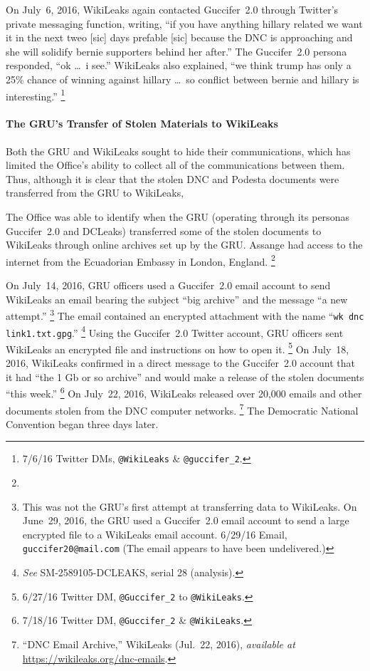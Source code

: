 On July~6, 2016, WikiLeaks again contacted Guccifer~2.0 through Twitter's private messaging function, writing, ``if you have anything hillary related we want it in the next tweo [sic] days prefable [sic] because the DNC is approaching and she will solidify bernie supporters behind her after.''
The Guccifer~2.0 persona responded, ``ok \dots\ i see.''
WikiLeaks also explained, ``we think trump has only a 25\% chance of winning against hillary \dots\ so conflict between bernie and hillary is interesting.''%
\footnote{7/6/16 Twitter DMs, \verb+@WikiLeaks+ \& \verb+@guccifer_2+.}

\paragraph{The GRU's Transfer of Stolen Materials to WikiLeaks}

Both the GRU and WikiLeaks sought to hide their communications, which has limited the Office's ability to collect all of the communications between them.
Thus, although it is clear that the stolen DNC and Podesta documents were transferred from the GRU to WikiLeaks, 

The Office was able to identify when the GRU (operating through its personas Guccifer~2.0 and DCLeaks) transferred some of the stolen documents to WikiLeaks through online archives set up by the GRU\null.
Assange had access to the internet from the Ecuadorian Embassy in London, England.
\footnote{}

On July~14, 2016, GRU officers used a Guccifer~2.0 email account to send WikiLeaks an email bearing the subject ``big archive'' and the message ``a new attempt.''%
\footnote{This was not the GRU's first attempt at transferring data to WikiLeaks.
On June~29, 2016, the GRU used a Guccifer~2.0 email account to send a large encrypted file to a WikiLeaks email account.
6/29/16 Email, \verb+guccifer20@mail.com+
(The email appears to have been undelivered.)}
The email contained an encrypted attachment with the name ``\verb+wk dnc link1.txt.gpg+.''%
\footnote{\textit{See} SM-2589105-DCLEAKS, serial 28 (analysis).}
Using the Guccifer~2.0 Twitter account, GRU officers sent WikiLeaks an encrypted file and instructions on how to open it.%
\footnote{6/27/16 Twitter DM, \verb+@Guccifer_2+ to \verb+@WikiLeaks+.}
On July~18, 2016, WikiLeaks confirmed in a direct message to the Guccifer~2.0 account that it had ``the 1 Gb or so archive'' and would make a release of the stolen documents ``this week.''%
\footnote{7/18/16 Twitter DM, \verb+@Guccifer_2+ \& \verb+@WikiLeaks+.}
On July~22, 2016, WikiLeaks released over 20,000 emails and other documents stolen from the DNC computer networks.%
\footnote{``DNC Email Archive,'' WikiLeaks (Jul.~22, 2016), \textit{available at} \url{https://wikileaks.org/dnc-emails}.}
The Democratic National Convention began three days later.

